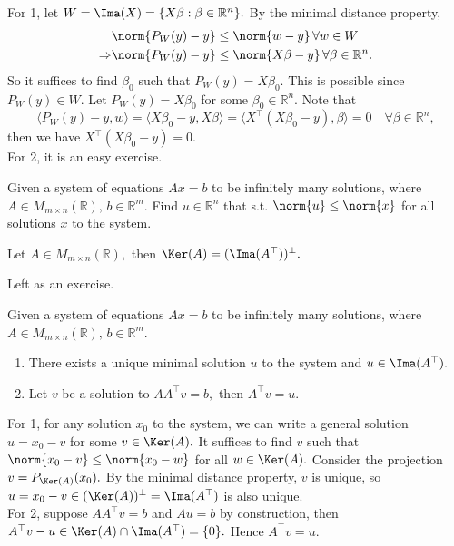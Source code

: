 \begin{pfbox}
    For 1, let $W=\Ima(X)=\{X\beta:\beta\in\mathbb{R}^n\}.$
    By the minimal distance property, 
    \begin{align*}
                &\norm{P_W(y)-y}\le\norm{w-y}\,\forall w\in W\\
     \Rightarrow &\norm{P_W(y)-y}\le\norm{X\beta-y}\,\forall \beta\in\mathbb{R}^n.
    \end{align*}
    So it suffices to find $\beta_0$ such that $P_W(y)=X\beta_0.$
    This is possible since $P_W(y)\in W.$
    Let $P_W(y)=X\beta_0$ for some $\beta_0\in\mathbb{R}^n.$
    Note that $$\langle P_W(y)-y, w\rangle = \langle X\beta_0-y, X\beta\rangle = \langle X^\top (X\beta_0-y), \beta\rangle=0\quad\forall \beta\in\mathbb{R}^n,$$
    then we have $X^\top (X\beta_0-y)=0.$\\

    For 2, it is an easy exercise.
\end{pfbox}



\begin{question}
        Given a system of equations $Ax=b$ to be infinitely many solutions, where $A\in M_{m\times n}(\mathbb{R}),\, b\in \mathbb{R}^m$. Find $u\in\mathbb{R}^n$ that s.t. $\norm{u}\le\norm{x}$ for all solutions $x$ to the system.
\end{question}

\begin{theorem}
    Let $A\in M_{m\times n}(\mathbb{R}),$ then $\Ker(A)=(\Ima(A^\top))^\perp.$ 
\end{theorem}

\begin{pfbox}
    Left as an exercise.
\end{pfbox}


\begin{theorem}
  Given a system of equations $Ax=b$ to be infinitely many solutions, where $A\in M_{m\times n}(\mathbb{R}),\, b\in \mathbb{R}^m$. 
  \begin{enumerate}
    \item There exists a unique minimal solution $u$ to the system and $u\in\Ima(A^\top).$
    \item Let $v$ be a solution to $AA^\top v=b,$ then $A^\top v=u.$ 
  \end{enumerate}
\end{theorem}

\begin{pfbox}
    For 1, for any solution $x_0$ to the system, we can write a general solution $u=x_0-v$ for some $v\in\Ker(A).$
    It suffices to find $v$ such that $\norm{x_0-v}\le\norm{x_0-w}$ for all $w\in\Ker(A).$ Consider the projection $v=P_{\Ker(A)}(x_0).$
    By the minimal distance property, $v$ is unique, so $u=x_0-v\in(\Ker(A))^\perp=\Ima(A^\top)$ is also unique.\\

    For 2, suppose $AA^\top v=b$ and $Au=b$ by construction, then $A^\top v-u\in\Ker(A)\cap\Ima(A^\top)=\{0\}.$
    Hence $A^\top v=u.$ 
\end{pfbox}


